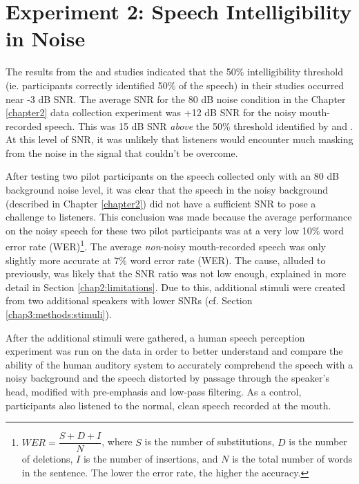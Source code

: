


\section{Experiment 2: Speech Intelligibility in Noise}
\label{expt2}

The results from the \cite{ding:13} and \cite{gilbert:13} studies indicated that the 50\% intelligibility threshold (ie. participants correctly identified 50\% of the speech) in their studies occurred near -3 dB SNR.  The average SNR for the 80 dB noise condition in the Chapter \ref{chapter2} data collection experiment was +12 dB SNR for the noisy mouth-recorded speech.  This was 15 dB SNR \textit{above} the 50\% threshold identified by \cite{ding:13} and \cite{gilbert:13}.  At this level of SNR, it was unlikely that listeners would encounter much masking from the noise in the signal that couldn't be overcome.

After testing two pilot participants on the speech collected only with an 80 dB background noise level, it was clear that the speech in the noisy background (described in Chapter \ref{chapter2}) did not have a sufficient SNR to pose a challenge to listeners.  This conclusion was made because the average performance on the noisy speech for these two pilot participants was at a very low 10\% word error rate (WER)\footnote{$WER = \dfrac{S+D+I}{N}$, where $S$ is the number of substitutions, $D$ is the number of deletions, $I$ is the number of insertions, and $N$ is the total number of words in the sentence. The lower the error rate, the higher the accuracy.}.  The average \textit{non}-noisy mouth-recorded speech was only slightly more accurate at 7\% word error rate (WER). The cause, alluded to previously, was likely that the SNR ratio was not low enough, explained in more detail in Section \ref{chap2:limitations}.  Due to this, additional stimuli were created from two additional speakers with lower SNRs (cf. Section \ref{chap3:methods:stimuli}).

After the additional stimuli were gathered, a human speech perception experiment was run on the data in order to better understand and compare the ability of the human auditory system to accurately comprehend the speech with a noisy background and the speech distorted by passage through the speaker's head, modified with pre-emphasis and low-pass filtering.  As a control, participants also listened to the normal, clean speech recorded at the mouth.

